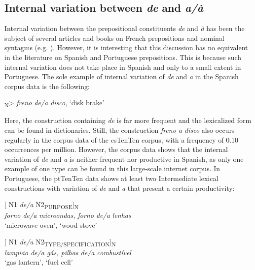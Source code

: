 \documentclass[output=paper]{langsci/langscibook}
\begin{document}
\subsection{Internal variation between \textit{de} and \textit{a/à}}

Internal variation between the prepositional constituents \textit{de} and \textit{à} has been the subject of several articles and books on French prepositions and nominal syntagms (e.g. \citealt{Anscombre:1990, Lang:1991, Bosredon:1991, Cadiot:1997}). However, it is interesting that this discussion has no equivalent in the literature on Spanish and Portuguese prepositions. This is because such internal variation does not take place in Spanish and only to a small extent in Portuguese. The sole example of internal variation of \textit{de} and \textit{a} in the Spanish corpus data is the following:

\ea{}\textsubscript{N}>		\textit{freno de/a disco},	`disk brake'\z

Here, the construction containing \textit{de} is far more frequent and the lexicalized form can be found in dictionaries. Still, the construction \textit{freno a disco} also occurs regularly in the corpus data of the esTenTen corpus, with a frequency of 0.10 occurrences per million. However, the corpus data shows that the internal variation of \textit{de} and \textit{a} is neither frequent nor productive in Spanish, as only one example of one type can be found in this large-scale internet corpus. In Portuguese, the ptTenTen data shows at least two Intermediate lexical constructions with variation of \textit{de} and \textit{a} that present a certain productivity:

\begin{exe}\ex\begin{minipage}[t]{0.4\textwidth}    %
[ N1 \textit{de/a} N2\textsubscript{PURPOSE}]\textsubscript{N}\\
\textit{forno de/a microondas,  forno de/a lenhas}\\
`microwave oven',         `wood stove'
\end{minipage}\hfill    %
\begin{minipage}[t]{0.45\textwidth}
[ N1 \textit{de/a} N2\textsubscript{TYPE/SPECIFICATION}]\textsubscript{N}\\
\textit{lampião de/a gás,   pilhas de/a combustível }\\
`gas lantern',           `fuel cell'
\end{minipage}%
\end{exe}
\end{document}
